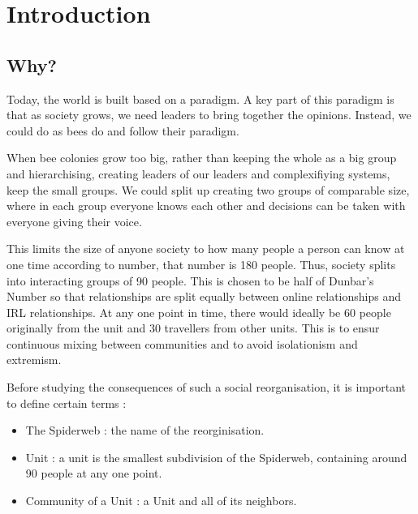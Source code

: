 \documentclass[12pt]{article}
\author{Maxime Muller}
\begin{document}
\clearpage\maketitle
\thispagestyle{empty}

\newpage
\setcounter{page}{1}
\section{Introduction}
\subsection{Why? }
Today, the world is built based on a paradigm. A key part of this paradigm is that as society grows, we need leaders to bring together the opinions. Instead, we could do as bees do and follow their paradigm. \par
When bee colonies grow too big, rather than keeping the whole as a big group and hierarchising, creating leaders of our leaders and complexifiying systems, keep the small groups. We could split up creating two groups of comparable size, where in each group everyone knows each other and decisions can be taken with everyone giving their voice. \par
This limits the size of anyone society to how many people a person can know at one time according to  number, that number is 180 people. Thus, society splits into interacting groups of 90 people. This is chosen to be half of Dunbar's Number so that relationships are split equally between online relationships and IRL relationships. At any one point in time, there would ideally be 60 people originally from the unit and 30 travellers from other units. This is to ensur continuous mixing between communities and to avoid isolationism and extremism. \par
\begin{definition}\label{def:divisions}
    Before studying the consequences of such a social reorganisation, it is important to define certain terms :
    \begin{itemize}
        \item The Spiderweb : the name of the reorginisation.
        \item Unit : a unit is the smallest subdivision of the Spiderweb, containing around 90 people at any one point.
        \item Community of a Unit : a Unit and all of its neighbors.
    \end{itemize}
\end{definition}
\end{document}

